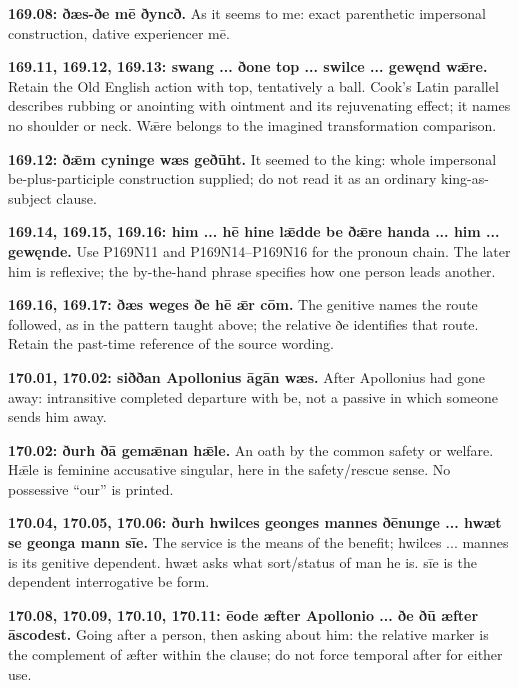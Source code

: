 \textbf{169.08: ðæs-ðe mē ðyncð.} As it seems to me: exact parenthetic impersonal construction, dative experiencer mē.

\textbf{169.11, 169.12, 169.13: swang ... ðone top ... swilce ... gewęnd wǣre.} Retain the Old English action with top, tentatively a ball. Cook’s Latin parallel describes rubbing or anointing with ointment and its rejuvenating effect; it names no shoulder or neck. Wǣre belongs to the imagined transformation comparison.

\textbf{169.12: ðǣm cyninge wæs geðūht.} It seemed to the king: whole impersonal be-plus-participle construction supplied; do not read it as an ordinary king-as-subject clause.

\textbf{169.14, 169.15, 169.16: him ... hē hine lǣdde be ðǣre handa ... him ... gewęnde.} Use P169N11 and P169N14–P169N16 for the pronoun chain. The later him is reflexive; the by-the-hand phrase specifies how one person leads another.

\textbf{169.16, 169.17: ðæs weges ðe hē ǣr cōm.} The genitive names the route followed, as in the pattern taught above; the relative ðe identifies that route. Retain the past-time reference of the source wording.

\textbf{170.01, 170.02: siððan Apollonius āgān wæs.} After Apollonius had gone away: intransitive completed departure with be, not a passive in which someone sends him away.

\textbf{170.02: ðurh ðā gemǣnan hǣle.} An oath by the common safety or welfare. Hǣle is feminine accusative singular, here in the safety/\allowbreak{}rescue sense. No possessive “our” is printed.

\textbf{170.04, 170.05, 170.06: ðurh hwilces geonges mannes ðēnunge ... hwæt se geonga mann sīe.} The service is the means of the benefit; hwilces ... mannes is its genitive dependent. hwæt asks what sort/\allowbreak{}status of man he is. sīe is the dependent interrogative be form.

\textbf{170.08, 170.09, 170.10, 170.11: ēode æfter Apollonio ... ðe ðū æfter āscodest.} Going after a person, then asking about him: the relative marker is the complement of æfter within the clause; do not force temporal after for either use.

